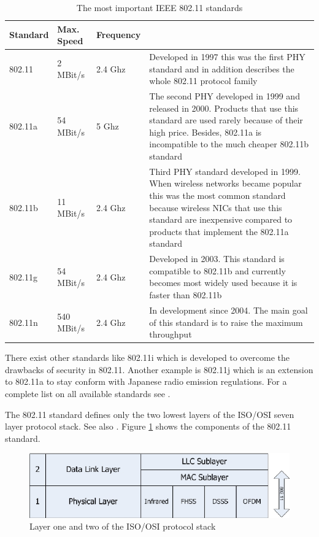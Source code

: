 \begin{table}[htbp]
	\begin{center}
		\begin{tabular}{|l|l|l|p{150pt}|}
		\hline
		\bf{Standard}&\bf{Max. Speed}&\bf{Frequency}&\\
		\hline
		802.11&2 MBit/s&2.4 Ghz&Developed in 1997 this was the first PHY
			standard and in addition describes the whole 802.11 protocol
			family\\
		\hline
		802.11a&54 MBit/s&5 Ghz&The second PHY developed in 1999 and released in
			2000. Products that use this standard are used rarely because of
			their high price. Besides, 802.11a is incompatible to the much
			cheaper 802.11b standard\\
		\hline
		802.11b&11 MBit/s&2.4 Ghz&Third PHY standard developed in 1999. When
			wireless networks became popular this was the most common standard
			because wireless NICs that use this standard are
			inexpensive compared to products that implement the 802.11a
			standard\\
		\hline
		802.11g&54 MBit/s&2.4 Ghz&Developed in 2003. This standard is compatible
			to 802.11b and currently becomes most widely used because it is
			faster than 802.11b\\
		\hline
		802.11n&540 MBit/s&2.4 Ghz&In development since 2004. The main goal of this standard is to raise the maximum throughput\\
		\hline
		\end{tabular}
	\end{center}
	\vspace{-1em}
	\caption{The most important IEEE 802.11 standards \cite{80211abgn}}
	\label{80211}
\end{table}

There exist other standards like 802.11i which is developed to overcome the drawbacks of security in 802.11. Another example is 802.11j which is an extension to 802.11a to stay conform with Japanese radio emission regulations. For a complete list on all available standards see \cite[p.10]{80211wireless}.

The 802.11 standard defines only the two lowest layers of the ISO/OSI seven layer protocol stack. See also \cite{80211tech}. Figure \ref{80211standard} shows the components of the 802.11 standard. \\

\begin{figure}[htbp]
	\begin{center}
		\includegraphics[width=0.9\columnwidth]{graphics/80211_protocol_stack}
	\end{center}
	\vspace{-1em}
	\caption{Layer one and two of the ISO/OSI protocol stack}
	\label{80211standard}
\end{figure}

